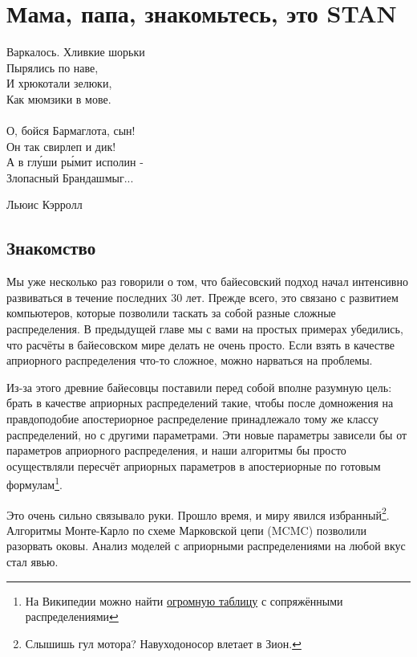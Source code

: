 \documentclass[12pt, a4paper, oneside]{extreport}
\theoremstyle{plain}              %
\theoremstyle{definition}         %
\begin{document}

\chapter{Мама, папа, знакомьтесь, это STAN}

\epigraph{
	Варкалось. Хливкие шорьки \\
	Пырялись по наве, \\
	И хрюкотали зелюки, \\
	Как мюмзики в мове. \\
	\mbox{    }\\
	О, бойся Бармаглота, сын!\\
	Он так свирлеп и дик! \\
	А в глу́ши ры́мит исполин - \\
	Злопасный Брандашмыг...}{Льюис Кэрролл}

\section{Знакомство} 

Мы уже несколько раз говорили о том, что байесовский подход начал интенсивно развиваться в течение последних 30 лет. Прежде всего, это связано с  развитием компьютеров, которые позволили таскать за собой разные сложные распределения. В предыдущей главе мы с вами на простых примерах убедились, что расчёты  в байесовском мире делать не очень просто. Если взять в качестве априорного распределения что-то сложное, можно нарваться на проблемы.

 Из-за этого древние байесовцы поставили перед собой вполне разумную цель: брать в качестве априорных распределений такие, чтобы после домножения на правдоподобие апостериорное распределение принадлежало тому же классу распределений, но с другими параметрами. Эти новые параметры зависели бы от параметров априорного распределения, и наши алгоритмы бы просто осуществляли пересчёт априорных параметров в апостериорные по готовым формулам\footnote{На Википедии можно найти \href{https://en.wikipedia.org/wiki/Conjugate_prior}{огромную таблицу} с сопряжёнными распределениями}.  
 
 Это очень сильно связывало руки. Прошло время, и миру явился избранный\footnote{Слышишь гул мотора? Навуходоносор влетает в Зион.}.  Алгоритмы Монте-Карло по схеме Марковской цепи (MCMC) позволили разорвать оковы. Анализ моделей с априорными распределениями на любой вкус стал явью.
 
\end{document}
